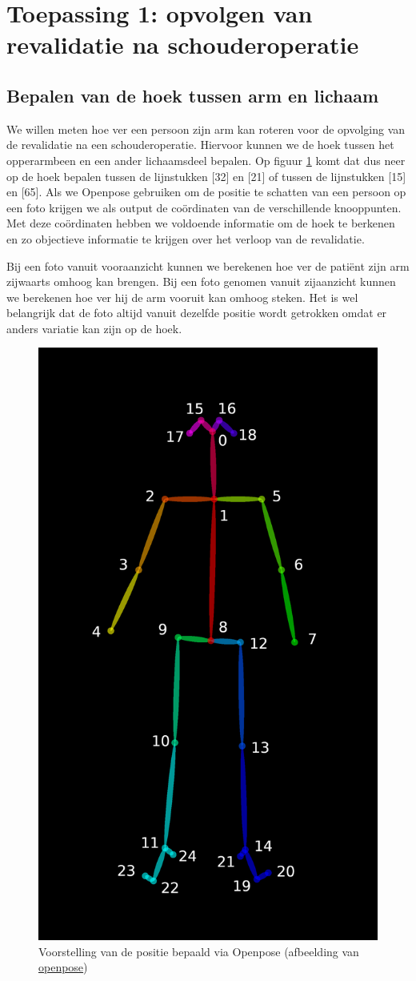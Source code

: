 \documentclass[a4paper,twoside,kulak]{kulakreport}
\begin{document}
\section{Toepassing 1: opvolgen van revalidatie na schouderoperatie}
\subsection{Bepalen van de hoek tussen arm en lichaam}

We willen meten hoe ver een persoon zijn arm kan roteren voor de opvolging van de revalidatie na een schouderoperatie. Hiervoor kunnen we de hoek tussen het opperarmbeen en een ander lichaamsdeel bepalen. Op figuur \ref{fig:skelet} komt dat dus neer op de hoek bepalen tussen de lijnstukken [32] en [21] of tussen de lijnstukken [15] en [65]. Als we Openpose gebruiken om de positie te schatten van een persoon op een foto krijgen we als output de coördinaten van de verschillende knooppunten. Met deze coördinaten hebben we voldoende informatie om de hoek te berkenen en zo objectieve informatie te krijgen over het verloop van de revalidatie.


Bij een foto vanuit vooraanzicht kunnen we berekenen hoe ver de patiënt zijn arm zijwaarts omhoog kan brengen. Bij een foto genomen vanuit zijaanzicht kunnen we berekenen hoe ver hij de arm vooruit kan omhoog steken. Het is wel belangrijk dat de foto altijd vanuit dezelfde positie wordt getrokken omdat er anders variatie kan zijn op de hoek.



\begin{figure}[H]
	\centering
	\includegraphics[width=.5\textwidth]{HPE_skelet}
	\caption{Voorstelling van de positie bepaald via Openpose (afbeelding van \href{https://github.com/CMU-Perceptual-Computing-Lab/openpose/blob/master/doc/output.md}{openpose})}
	\label{fig:skelet}
\end{figure}
\end{document}
